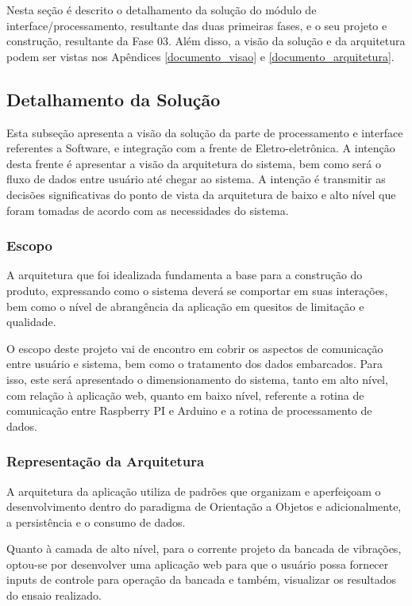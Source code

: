 \label{desenvolvimento_processamento}

Nesta seção é descrito o detalhamento da solução do módulo de interface/processamento, resultante das duas primeiras fases, 
e o seu projeto e construção, resultante da Fase 03. Além disso, a visão da solução e da arquitetura podem ser vistas nos Apêndices
\ref{documento_visao} e \ref{documento_arquitetura}.

\subsection{Detalhamento da Solução} \label{software:detalhamento_solucao}
Esta subseção apresenta a visão da solução da parte de processamento e interface referentes a Software, e
integração com a frente de Eletro-eletrônica. A intenção desta frente é apresentar a visão da arquitetura do sistema,
bem como será o fluxo de dados entre usuário até chegar ao sistema. A intenção é transmitir as decisões significativas do 
ponto de vista da arquitetura de baixo e alto nível que foram tomadas de acordo com as necessidades do sistema.

\subsubsection*{\textbf{Escopo}}

A arquitetura que foi idealizada fundamenta a base para a construção do produto, expressando como o sistema deverá se 
comportar em suas interações, bem como o nível de abrangência da aplicação em quesitos de limitação e qualidade.

O escopo deste projeto vai de encontro em cobrir os aspectos de comunicação entre usuário e sistema, bem como o tratamento
dos dados embarcados. Para isso, este será apresentado o dimensionamento do sistema, tanto em alto nível, com relação à aplicação 
web, quanto em baixo nível, referente a rotina de comunicação entre Raspberry PI e Arduino e a rotina de processamento de dados.

\subsubsection*{\textbf{Representação da Arquitetura}}

A arquitetura da aplicação utiliza de padrões que organizam e aperfeiçoam o desenvolvimento dentro do paradigma de Orientação a 
Objetos e adicionalmente, a persistência e o consumo de dados.

Quanto à camada de alto nível, para o corrente projeto da bancada de vibrações, optou-se por desenvolver uma aplicação web para que 
o usuário possa fornecer inputs de controle para operação da bancada e também, visualizar os resultados do ensaio realizado.

